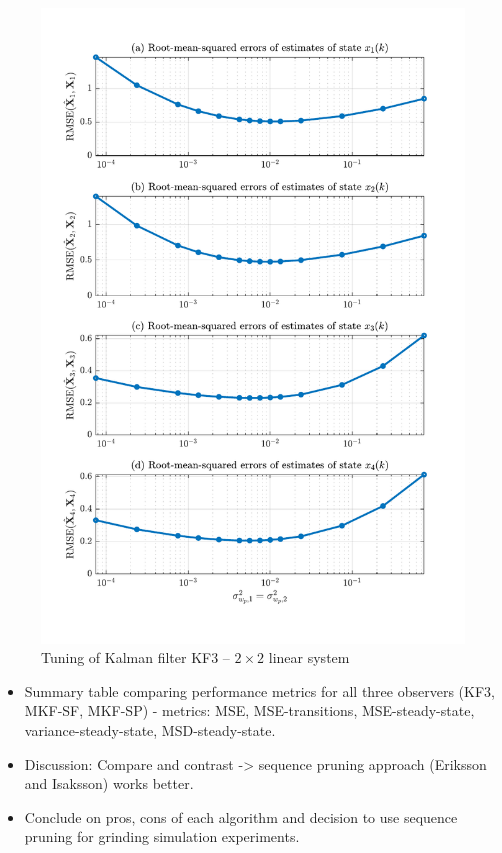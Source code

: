 \begin{figure}[htp]
	\centering
	\includegraphics[width=14cm]{images/rod_obs_sim2_3KF_Q_seed_0.pdf}
	\caption{Tuning of Kalman filter KF3 – $2\times2$ linear system}
	\label{fig:sim-sys-siso--KF3-tuning}
\end{figure}

\begin{itemize}
	\item Summary table comparing performance metrics for all three observers (KF3, MKF-SF, MKF-SP) - metrics: MSE, MSE-transitions, MSE-steady-state, variance-steady-state, MSD-steady-state.
	\item Discussion: Compare and contrast -> sequence pruning approach (Eriksson and Isaksson) works better.
	\item Conclude on pros, cons of each algorithm and decision to use sequence pruning for grinding simulation experiments.
\end{itemize}

